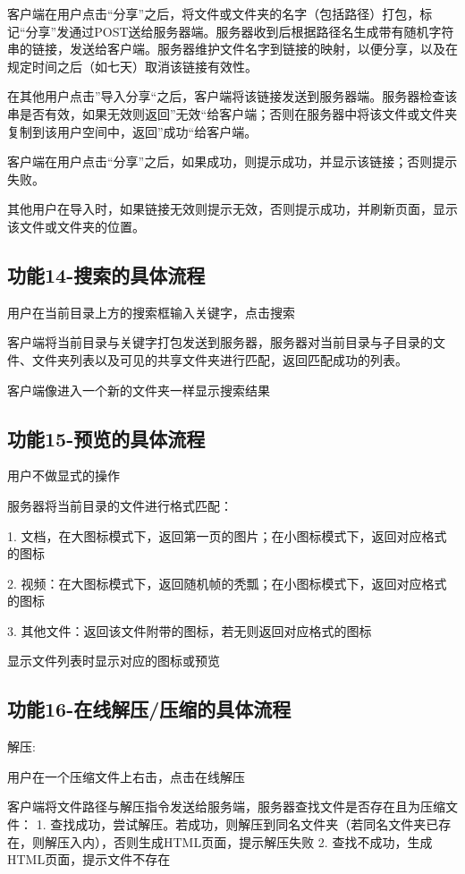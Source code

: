 客户端在用户点击“分享”之后，将文件或文件夹的名字（包括路径）打包，标记“分享”发通过POST送给服务器端。服务器收到后根据路径名生成带有随机字符串的链接，发送给客户端。服务器维护文件名字到链接的映射，以便分享，以及在规定时间之后（如七天）取消该链接有效性。

在其他用户点击”导入分享“之后，客户端将该链接发送到服务器端。服务器检查该串是否有效，如果无效则返回”无效“给客户端；否则在服务器中将该文件或文件夹复制到该用户空间中，返回”成功“给客户端。

客户端在用户点击“分享”之后，如果成功，则提示成功，并显示该链接；否则提示失败。

其他用户在导入时，如果链接无效则提示无效，否则提示成功，并刷新页面，显示该文件或文件夹的位置。

\subsection{功能14-搜索的具体流程}
用户在当前目录上方的搜索框输入关键字，点击搜索

客户端将当前目录与关键字打包发送到服务器，服务器对当前目录与子目录的文件、文件夹列表以及可见的共享文件夹进行匹配，返回匹配成功的列表。

客户端像进入一个新的文件夹一样显示搜索结果

\subsection{功能15-预览的具体流程}
用户不做显式的操作

服务器将当前目录的文件进行格式匹配：

1. 文档，在大图标模式下，返回第一页的图片；在小图标模式下，返回对应格式的图标

2. 视频：在大图标模式下，返回随机帧的秃瓢；在小图标模式下，返回对应格式的图标

3. 其他文件：返回该文件附带的图标，若无则返回对应格式的图标

显示文件列表时显示对应的图标或预览

\subsection{功能16-在线解压/压缩的具体流程}
解压:

用户在一个压缩文件上右击，点击在线解压

客户端将文件路径与解压指令发送给服务端，服务器查找文件是否存在且为压缩文件：
1. 查找成功，尝试解压。若成功，则解压到同名文件夹（若同名文件夹已存在，则解压入内），否则生成HTML页面，提示解压失败
2. 查找不成功，生成HTML页面，提示文件不存在

